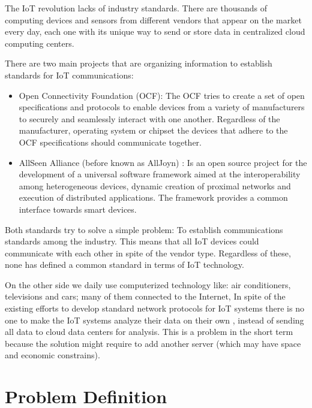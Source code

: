 The IoT revolution lacks of industry standards. There are thousands of
computing devices and sensors from different vendors that appear on the market
every day, each one with its unique way to send or store data in centralized
cloud computing centers. 

There are two main projects that are organizing information to establish
standards for IoT communications: 

\begin{itemize}

\item Open Connectivity Foundation (OCF)\cite{Terry}: The OCF tries to create a
set of open specifications and protocols to enable devices from a variety of
manufacturers to securely and seamlessly interact with one another. Regardless
of the manufacturer, operating system or chipset the devices that adhere to the
OCF specifications should communicate together. 

\item AllSeen Alliance (before known as AllJoyn) \cite{Massimo}: Is an open
source project for the development of a universal software framework aimed at
the interoperability among heterogeneous devices, dynamic creation of proximal
networks and execution of distributed applications. The framework provides a
common interface towards smart devices.

\end{itemize}

Both standards try to solve a simple problem: To establish communications
standards among the industry. This means that all IoT devices could communicate
with each other in spite of the vendor type. Regardless of these, none has
defined a common standard in terms of IoT technology. 

On the other side we daily use computerized technology like: air conditioners,
televisions and cars; many of them connected to the Internet, In spite of the
existing efforts to develop standard network protocols for IoT systems there is
no one to make the IoT systems analyze their data on their own , instead of
sending all data to cloud data centers for analysis. This is a problem in the
short term because the solution might require to add another server (which may
have space and economic constrains).



\section{Problem Definition} \noindent


